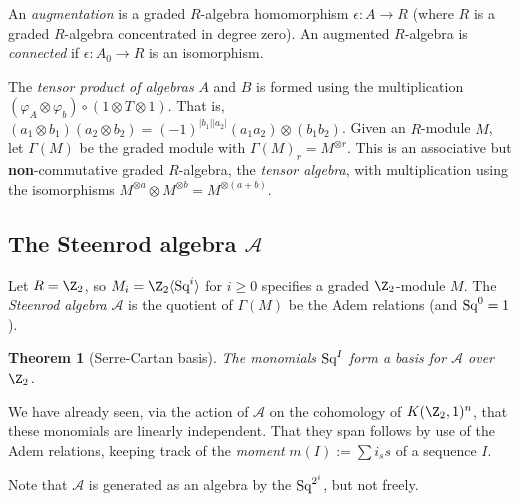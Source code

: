 \documentclass[11pt]{article}
\renewcommand{\phi}{\varphi}
\newcommand{\Squ}{\textup{Sq}}
\theoremstyle{plain}
\newtheorem*{thm*}{Theorem}
\theoremstyle{definition}
\renewcommand{\to}{\longrightarrow}
\newcommand{\Steen}{\mathscr{A}}
\begin{document}
An \emph{augmentation} is a graded $R$-algebra homomorphism $\epsilon:A\to R$ (where $R$ is a graded $R$-algebra concentrated in degree zero). An augmented $R$-algebra is \emph{connected} if $\epsilon:A_0\to R$ is an isomorphism.

The \emph{tensor product of algebras} $A$ and $B$ is formed using the multiplication $(\phi_A\otimes\phi_b)\circ(1\otimes T\otimes 1)$. That is, $(a_1\otimes b_1)(a_2\otimes b_2)=(-1)^{|b_1||a_2|}(a_1a_2)\otimes(b_1b_2)$. Given an $R$-module $M$, let $\Gamma(M)$ be the graded module with $\Gamma(M)_r=M^{\otimes r}$. This is an associative but \textbf{non}-commutative graded $R$-algebra, the \emph{tensor algebra}, with multiplication using the isomorphisms $M^{\otimes a}\otimes M^{\otimes b}=M^{\otimes (a+b)}$.

\subsection{The Steenrod algebra $\Steen$}
Let $R=\Z_2$, so $M_i=\Z_2\langle\Squ^i\rangle$ for $i\geq0$ specifies a graded $\Z_2$-module $M$. The \emph{Steenrod algebra} $\Steen$ is the quotient of $\Gamma(M)$ be the Adem relations (and $\Squ^0=1$).
\begin{thm*}[Serre-Cartan basis]
The monomials $\Squ^I$ form a basis for $\Steen$ over $\Z_2$.
\end{thm*}
We have already seen, via the action of $\Steen$ on the cohomology of $K(\Z_2,1)^n$, that these monomials are linearly independent. That they span follows by use of the Adem relations, keeping track of the \emph{moment} $m(I):=\sum i_ss$ of a sequence $I$.

Note that $\Steen$ is generated as an algebra by the $\Squ^{2^i}$, but not freely.
\setcounter{subsection}{3}
\end{document}

